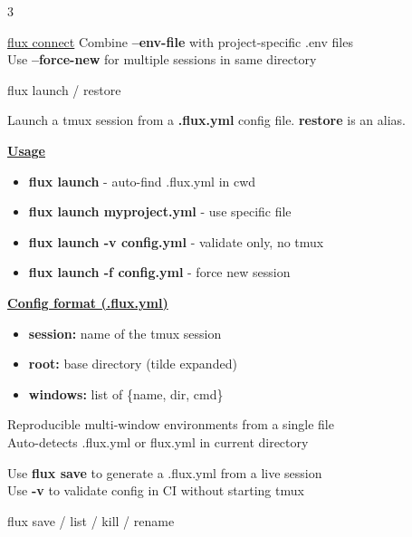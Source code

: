 \documentclass[10pt,a4paper]{article}
\begin{document}
\begin{multicols}{3}
\begin{textbox}{\href{https://github.com/lotape6/flux-capacitor}{flux connect}}
Combine \textbf{--env-file} with project-specific .env files\\

Use \textbf{--force-new} for multiple sessions in same directory\\

\end{textbox}

\begin{textbox}{flux launch / restore}

Launch a tmux session from a \textbf{.flux.yml} config file. \textbf{restore} is an alias.

\underline{\textbf{Usage}}
\begin{itemize}
    \item \textbf{flux launch} - auto-find .flux.yml in cwd
    \item \textbf{flux launch myproject.yml} - use specific file
    \item \textbf{flux launch -v config.yml} - validate only, no tmux
    \item \textbf{flux launch -f config.yml} - force new session
\end{itemize}

\underline{\textbf{Config format (.flux.yml)}}
\begin{itemize}
    \item \textbf{session:} name of the tmux session
    \item \textbf{root:} base directory (tilde expanded)
    \item \textbf{windows:} list of \{name, dir, cmd\}
\end{itemize}


Reproducible multi-window environments from a single file\\

Auto-detects .flux.yml or flux.yml in current directory\\


Use \textbf{flux save} to generate a .flux.yml from a live session\\

Use \textbf{-v} to validate config in CI without starting tmux\\

\end{textbox}

\begin{textbox}{flux save / list / kill / rename}


\end{textbox}
\end{multicols}
\end{document}

